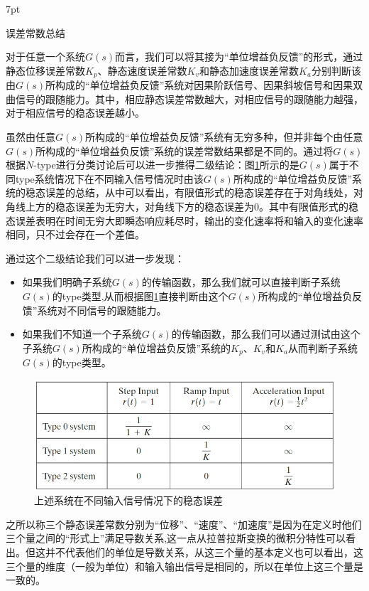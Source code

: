 \documentclass{article}
\numberwithin{equation}{section}
\numberwithin{figure}{section}
\newenvironment{formal}{%
\def\FrameCommand{%
\hspace{1pt}%
{\color{DarkBlue}\vrule width 2pt}%
{\color{formalshade}\vrule width 4pt}%
\colorbox{formalshade}%
}%
\MakeFramed{\advance\hsize-\width\FrameRestore}%
\noindent\hspace{-4.55pt}%
\begin{adjustwidth}{}{7pt}%
\vspace{2pt}\vspace{2pt}%
}
{%
\vspace{2pt}\end{adjustwidth}\endMakeFramed%
}
\begin{document}
\begin{formal}
    误差常数总结
\end{formal}
对于任意一个系统$G(s)$而言，我们可以将其接为“单位增益负反馈”的形式，通过静态位移误差常数$K_p$、静态速度误差常数$K_v$和静态加速度误差常数$K_a$分别判断该由$G(s)$所构成的“单位增益负反馈”系统对因果阶跃信号、因果斜坡信号和因果双曲信号的跟随能力。其中，相应静态误差常数越大，对相应信号的跟随能力越强，对于相应信号的稳态误差越小。

虽然由任意$G(s)$所构成的“单位增益负反馈”系统有无穷多种，但并非每个由任意$G(s)$所构成的“单位增益负反馈”系统的误差常数结果都是不同的。通过将$G(s)$根据$N$-type进行分类讨论后可以进一步推得二级结论：图\ref{Steady-StateError}所示的是$G(s)$属于不同type系统情况下在不同输入信号情况时由该$G(s)$所构成的“单位增益负反馈”系统的稳态误差的总结，从中可以看出，有限值形式的稳态误差存在于对角线处，对角线上方的稳态误差为无穷大，对角线下方的稳态误差为0。其中有限值形式的稳态误差表明在时间无穷大即瞬态响应耗尽时，输出的变化速率将和输入的变化速率相同，只不过会存在一个差值。

通过这个二级结论我们可以进一步发现：
\begin{itemize}
    \item 如果我们明确子系统$G(s)$的传输函数，那么我们就可以直接判断子系统$G(s)$的type类型,从而根据图\ref{Steady-StateError}直接判断由这个$G(s)$所构成的“单位增益负反馈”系统对不同信号的跟随能力。
    \item 如果我们不知道一个子系统$G(s)$的传输函数，那么我们可以通过测试由这个子系统$G(s)$所构成的“单位增益负反馈”系统的$K_p$、$K_v$和$K_a$从而判断子系统$G(s)$的type类型。
\end{itemize}

\begin{figure}
    \centering
    \includegraphics[width=.6\textwidth]{Chapter5/Steady-StateError.png} %
    \caption{上述系统在不同输入信号情况下的稳态误差} %
    \label{Steady-StateError} %
\end{figure}

之所以称三个静态误差常数分别为“位移”、“速度”、“加速度”是因为在定义时他们三个量之间的“形式上”满足导数关系,这一点从拉普拉斯变换的微积分特性可以看出。但这并不代表他们的单位是导数关系，从这三个量的基本定义也可以看出，这三个量的维度（一般为单位）和输入输出信号是相同的，所以在单位上这三个量是一致的。
\end{document}
